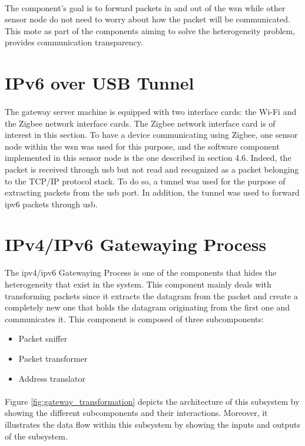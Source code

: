 \documentclass[oneside,12pt,a4paper,final]{book}
\begin{document}
\paragraph{}
The component's goal is to forward packets in and out of the \gls{wsn} while other sensor node do not need to worry about how the packet will be communicated. This mote as part of the components aiming to solve the heterogeneity problem, provides communication transparency.

\section{IPv6 over USB Tunnel}
\paragraph{}
The gateway server machine is equipped with two interface cards: the Wi-Fi and the Zigbee network interface cards. The Zigbee network interface card is of interest in this section. To have a device communicating using Zigbee, one sensor node within the \gls{wsn} was used for this purpose, and the software component implemented in this sensor node is the one described in section 4.6. Indeed, the packet is received through \gls{usb} but not read and recognized as a packet belonging to the TCP/IP protocol stack. To do so, a tunnel was used for the purpose of extracting packets from the \gls{usb} port. In addition, the tunnel was used to forward \gls{ipv6} packets through \gls{usb}.

\section{IPv4/IPv6 Gatewaying Process}
The \gls{ipv4}/\gls{ipv6} Gatewaying Process is one of the components that hides the heterogeneity that exist in the system. This component mainly deals with transforming packets since it extracts the datagram from the packet and create a completely new one that holds the datagram originating from the first one and communicates it. This component is composed of three subcomponents:
\begin{itemize}
\item Packet sniffer
\item Packet transformer
\item Address translator
\end{itemize}
\paragraph{}
Figure \ref{fig:gateway_transformation} depicts the architecture of this subsystem by showing the different subcomponents and their interactions. Moreover, it illustrates the data flow within this subsystem by showing the inputs and outputs of the subsystem.
\end{document}
